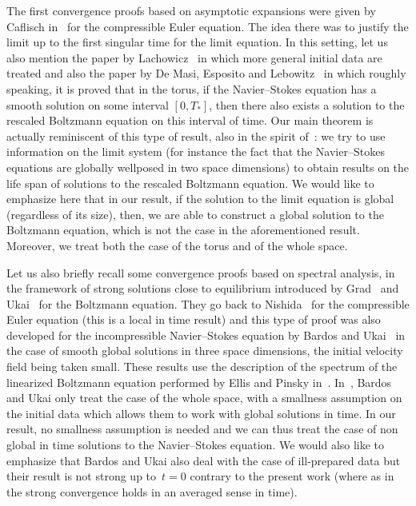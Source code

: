 The first convergence proofs based on asymptotic expansions were given by Caflisch in~\cite{Caflisch} for the compressible Euler equation. The idea there was to justify the limit up to the first singular time for the limit equation. In this setting, let us also mention the paper by Lachowicz~\cite{Lachowicz} in which more general initial data are treated and also the paper by De Masi, Esposito and Lebowitz~\cite{DeMasi-Esposito-Lebowitz} in which roughly speaking, it is proved that in the torus, if the Navier--Stokes equation has a smooth solution on some interval $[0,T_*]$, then there also exists a solution to the rescaled Boltzmann equation on this interval of time. Our main theorem is actually reminiscent of this type of result, also in the spirit of~\cite{BMN,CDGG,Grenier,Schochet}: we try to use information on the limit system (for instance the fact that the Navier--Stokes equations are globally wellposed in two space dimensions) to obtain results on the life span of solutions to the rescaled Boltzmann equation. We would like to emphasize here that in our result, if the solution to the limit equation is global (regardless of its size), then, we are able to construct a global solution to the Boltzmann equation, which is not the case in the aforementioned result. Moreover, we treat both the case of the torus and of the whole space.

Let us also briefly recall some convergence proofs based on spectral analysis, in the framework of strong solutions close to equilibrium introduced by Grad~\cite{Grad} and Ukai~\cite{Ukai} for the Boltzmann equation. They go back to Nishida~\cite{Nishida} for the compressible Euler equation (this is a local in time result) and this type of proof was also developed for the incompressible Navier--Stokes equation by Bardos and Ukai~\cite{Bardos-Ukai} in the case of smooth global solutions in three space dimensions, the initial velocity field being taken small. These results use the description of the spectrum of the linearized Boltzmann equation performed by Ellis and Pinsky in~\cite{Ellis-Pinsky}. In~\cite{Bardos-Ukai}, Bardos and Ukai only treat the case of the whole space, with a smallness assumption on the initial data which allows them to work with global solutions in time. In our result, no smallness assumption is needed and we can thus treat the case of non global in time solutions to the Navier--Stokes equation. We would also like to emphasize that Bardos and Ukai also deal with the case of ill-prepared data but their result is not strong up to~$t=0$ contrary to the present work (where as in~\cite{Briant} the strong convergence holds in an averaged sense in time).




